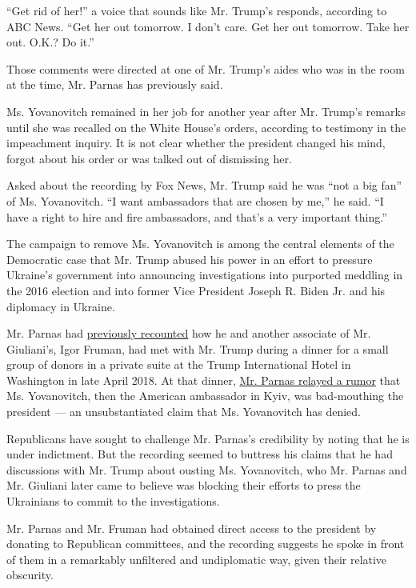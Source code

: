 ``Get rid of her!'' a voice that sounds like Mr. Trump's responds,
according to ABC News. ``Get her out tomorrow. I don't care. Get her out
tomorrow. Take her out. O.K.? Do it.''

Those comments were directed at one of Mr. Trump's aides who was in the
room at the time, Mr. Parnas has previously said.

Ms. Yovanovitch remained in her job for another year after Mr. Trump's
remarks until she was recalled on the White House's orders, according to
testimony in the impeachment inquiry. It is not clear whether the
president changed his mind, forgot about his order or was talked out of
dismissing her.

Asked about the recording by Fox News, Mr. Trump said he was ``not a big
fan'' of Ms. Yovanovitch. ``I want ambassadors that are chosen by me,''
he said. ``I have a right to hire and fire ambassadors, and that's a
very important thing.''

The campaign to remove Ms. Yovanovitch is among the central elements of
the Democratic case that Mr. Trump abused his power in an effort to
pressure Ukraine's government into announcing investigations into
purported meddling in the 2016 election and into former Vice President
Joseph R. Biden Jr. and his diplomacy in Ukraine.

Mr. Parnas had
\href{https://www.msnbc.com/rachel-maddow/watch/parnas-describes-how-trump-struggled-to-fire-amb-yovanovitch-76929093782}{previously
recounted} how he and another associate of Mr. Giuliani's, Igor Fruman,
had met with Mr. Trump during a dinner for a small group of donors in a
private suite at the Trump International Hotel in Washington in late
April 2018. At that dinner,
\href{https://www.nytimes.com/2019/12/19/nyregion/lev-parnas-igor-fruman.html}{Mr.
Parnas relayed a rumor} that Ms. Yovanovitch, then the American
ambassador in Kyiv, was bad-mouthing the president --- an
unsubstantiated claim that Ms. Yovanovitch has denied.

Republicans have sought to challenge Mr. Parnas's credibility by noting
that he is under indictment. But the recording seemed to buttress his
claims that he had discussions with Mr. Trump about ousting Ms.
Yovanovitch, who Mr. Parnas and Mr. Giuliani later came to believe was
blocking their efforts to press the Ukrainians to commit to the
investigations.

Mr. Parnas and Mr. Fruman had obtained direct access to the president by
donating to Republican committees, and the recording suggests he spoke
in front of them in a remarkably unfiltered and undiplomatic way, given
their relative obscurity.

